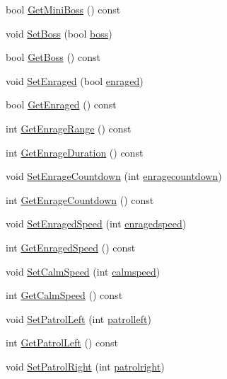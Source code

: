 \begin{DoxyCompactItemize}
\item 
bool \hyperlink{classAI_a4b16ff859e873a2fe1b5b2eae5a7c5ab}{Get\+Mini\+Boss} () const 
\item 
void \hyperlink{classAI_a6c385b58bce2c0314e521addee4ba209}{Set\+Boss} (bool \hyperlink{classAI_a1fa0702b9e1c4b6a29227dfc6e58be46}{boss})
\item 
bool \hyperlink{classAI_abcffa9942e266731c6993c2040e69f6e}{Get\+Boss} () const 
\item 
void \hyperlink{classAI_a9fbf2081f38575bc61a7f251b2bb9a3b}{Set\+Enraged} (bool \hyperlink{classAI_a0b809846d43813799b3e44c42114e9a1}{enraged})
\item 
bool \hyperlink{classAI_aec03758c556c899055e9cbaf255dc500}{Get\+Enraged} () const 
\item 
int \hyperlink{classAI_aeba013301a6a62af203c8e0ad204d40b}{Get\+Enrage\+Range} () const 
\item 
int \hyperlink{classAI_a41d1bb99dc6892c367c23a799ad9aec6}{Get\+Enrage\+Duration} () const 
\item 
void \hyperlink{classAI_af9e9f4b5bef37e9800dbeb5e20adddf2}{Set\+Enrage\+Countdown} (int \hyperlink{classAI_a155447249032f20011edefe8be3d081d}{enragecountdown})
\item 
int \hyperlink{classAI_adfd6fae7457c89e305d4d3f17ddc41a1}{Get\+Enrage\+Countdown} () const 
\item 
void \hyperlink{classAI_a82152a7a8a96bbd259ced87eea4f4ef8}{Set\+Enraged\+Speed} (int \hyperlink{classAI_af6b753eddb25c163d5b359420b314d4e}{enragedspeed})
\item 
int \hyperlink{classAI_a92907b66d44bf13562d95e54cc5513b6}{Get\+Enraged\+Speed} () const 
\item 
void \hyperlink{classAI_a88eb2b0ed216184bb890dc4e763b5d1c}{Set\+Calm\+Speed} (int \hyperlink{classAI_abdd48a54d265d83866f11fbe2ad8eed0}{calmspeed})
\item 
int \hyperlink{classAI_adaccf4bbe450127d198e46d7b8cf4f5c}{Get\+Calm\+Speed} () const 
\item 
void \hyperlink{classAI_ac97aecfd5b2950e30befa579fe2b2e2b}{Set\+Patrol\+Left} (int \hyperlink{classAI_a8a572d9fa33e579a4c8eea9e1ab09e8f}{patrolleft})
\item 
int \hyperlink{classAI_a7110967584c670de961d47f2bf04f7b0}{Get\+Patrol\+Left} () const 
\item 
void \hyperlink{classAI_aa2afe9d83b68d31ab6b0bc6df452d344}{Set\+Patrol\+Right} (int \hyperlink{classAI_a5af0047dcf09f37b7f2feb8d2b078ce8}{patrolright})
\item 

\end{DoxyCompactItemize}
